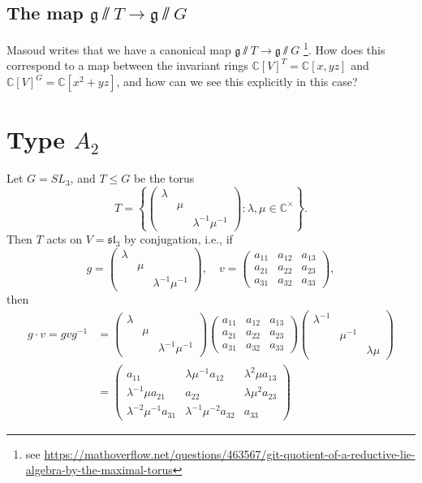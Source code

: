 \documentclass[12pt]{amsart}
\newcommand{\C}{\mathbb{C}}
\theoremstyle{remark}
\theoremstyle{remark}
\begin{document}
\subsection*{The map $\mathfrak{g}\sslash T \to \mathfrak{g}\sslash G$} 
Masoud writes that we have a canonical map $\mathfrak{g}\sslash T \to \mathfrak{g}\sslash G$ \footnote{see \url{https://mathoverflow.net/questions/463567/git-quotient-of-a-reductive-lie-algebra-by-the-maximal-torus}}.
How does this correspond to a map between the invariant rings $\C[V]^T = \C[x, yz]$ and $\C[V]^G=\C[x^2 + yz]$, and how can we see this explicitly in this case?


\section*{Type $A_2$}
Let $G = SL_3$, and $T \le G$ be the torus
$$T = \left\{\begin{pmatrix} \lambda & & \\ & \mu & \\ & & \lambda^{-1} \mu^{-1} \end{pmatrix} : \lambda, \mu \in\C^\times \right\}.$$
Then $T$ acts on $V = \mathfrak{sl}_3$ by conjugation, i.e., if
$$g = \begin{pmatrix} \lambda & & \\ & \mu & \\ & & \lambda^{-1} \mu^{-1} \end{pmatrix}, \quad v = \begin{pmatrix} a_{11} & a_{12} & a_{13} \\ a_{21} & a_{22} & a_{23} \\ a_{31} & a_{32} & a_{33} \end{pmatrix},$$
then
\begin{align*}
g \cdot v = g v g^{-1} &= \begin{pmatrix} \lambda & & \\ & \mu & \\ & & \lambda^{-1} \mu^{-1} \end{pmatrix} \begin{pmatrix} a_{11} & a_{12} & a_{13} \\ a_{21} & a_{22} & a_{23} \\ a_{31} & a_{32} & a_{33} \end{pmatrix} \begin{pmatrix} \lambda^{-1} & & \\ & \mu^{-1} & \\ & & \lambda \mu \end{pmatrix} \\
&= 
\begin{pmatrix}
a_{11} & \lambda \mu^{-1} a_{12} & \lambda^2 \mu a_{13} \\
\lambda^{-1} \mu a_{21} & a_{22} & \lambda \mu^2 a_{23} \\
\lambda^{-2} \mu^{-1} a_{31} & \lambda^{-1} \mu^{-2} a_{32} & a_{33}
\end{pmatrix}
\end{align*}
\end{document}

